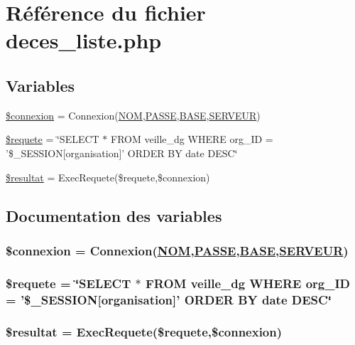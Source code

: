 \hypertarget{deces__liste_8php}{
\section{R\'{e}f\'{e}rence du fichier deces\_\-liste.php}
\label{deces__liste_8php}
}
\subsection*{Variables}
\begin{CompactItemize}
\item 
\hyperlink{deces__liste_8php_a0}{\$connexion} = Connexion(\hyperlink{pma__connect_8php_a0}{NOM},\hyperlink{pma__connect_8php_a1}{PASSE},\hyperlink{pma__connect_8php_a3}{BASE},\hyperlink{pma__connect_8php_a2}{SERVEUR})
\item 
\hyperlink{deces__liste_8php_a1}{\$requete} = \char`\"{}SELECT $\ast$ FROM veille\_\-dg WHERE org\_\-ID = '\$\_\-SESSION\mbox{[}organisation\mbox{]}' ORDER BY date DESC\char`\"{}
\item 
\hyperlink{deces__liste_8php_a2}{\$resultat} = Exec\-Requete(\$requete,\$connexion)
\end{CompactItemize}


\subsection{Documentation des variables}
\hypertarget{deces__liste_8php_a0}{
\subsubsection[\$connexion]{\setlength{\rightskip}{0pt plus 5cm}\$connexion = Connexion(\hyperlink{pma__connect_8php_a0}{NOM},\hyperlink{pma__connect_8php_a1}{PASSE},\hyperlink{pma__connect_8php_a3}{BASE},\hyperlink{pma__connect_8php_a2}{SERVEUR})}}
\label{deces__liste_8php_a0}


\hypertarget{deces__liste_8php_a1}{
\subsubsection[\$requete]{\setlength{\rightskip}{0pt plus 5cm}\$requete = \char`\"{}SELECT $\ast$ FROM veille\_\-dg WHERE org\_\-ID = '\$\_\-SESSION\mbox{[}organisation\mbox{]}' ORDER BY date DESC\char`\"{}}}
\label{deces__liste_8php_a1}


\hypertarget{deces__liste_8php_a2}{
\subsubsection[\$resultat]{\setlength{\rightskip}{0pt plus 5cm}\$resultat = Exec\-Requete(\$requete,\$connexion)}}
\label{deces__liste_8php_a2}


